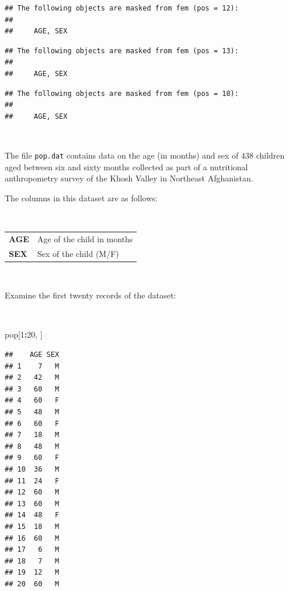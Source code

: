 \documentclass[12pt,a4paper]{book}
\newenvironment{Shaded}{\begin{snugshade}}{\end{snugshade}}
\newcommand{\DecValTok}[1]{\textcolor[rgb]{0.00,0.00,0.81}{#1}}
\newcommand{\OperatorTok}[1]{\textcolor[rgb]{0.81,0.36,0.00}{\textbf{#1}}}
\newcommand{\NormalTok}[1]{#1}
\theoremstyle{definition}
\theoremstyle{definition}
\theoremstyle{definition}
\theoremstyle{remark}
\begin{document}
\begin{verbatim}
## The following objects are masked from fem (pos = 12):
## 
##     AGE, SEX
\end{verbatim}

\begin{verbatim}
## The following objects are masked from fem (pos = 13):
## 
##     AGE, SEX
\end{verbatim}

\begin{verbatim}
## The following objects are masked from fem (pos = 18):
## 
##     AGE, SEX
\end{verbatim}

~

The file \texttt{pop.dat} contains data on the age (in months) and sex
of 438 children aged between six and sixty months collected as part of a
nutritional anthropometry survey of the Khosh Valley in Northeast
Afghanistan.

The columns in this dataset are as follows:

~

\begin{longtable}[]{@{}ll@{}}
\toprule
\begin{minipage}[t]{0.14\columnwidth}\raggedright
\textbf{AGE}\strut
\end{minipage} & \begin{minipage}[t]{0.38\columnwidth}\raggedright
Age of the child in months\strut
\end{minipage}\tabularnewline
\begin{minipage}[t]{0.14\columnwidth}\raggedright
\textbf{SEX}\strut
\end{minipage} & \begin{minipage}[t]{0.38\columnwidth}\raggedright
Sex of the child (M/F)\strut
\end{minipage}\tabularnewline
\bottomrule
\end{longtable}

~

Examine the first twenty records of the dataset:

~

\begin{Shaded}
\begin{Highlighting}[]
\NormalTok{pop[}\DecValTok{1}\OperatorTok{:}\DecValTok{20}\NormalTok{, ]}
\end{Highlighting}
\end{Shaded}

\begin{verbatim}
##    AGE SEX
## 1    7   M
## 2   42   M
## 3   60   M
## 4   60   F
## 5   48   M
## 6   60   F
## 7   18   M
## 8   48   M
## 9   60   F
## 10  36   M
## 11  24   F
## 12  60   M
## 13  60   M
## 14  48   F
## 15  18   M
## 16  60   M
## 17   6   M
## 18   7   M
## 19  12   M
## 20  60   M
\end{verbatim}
\end{document}
